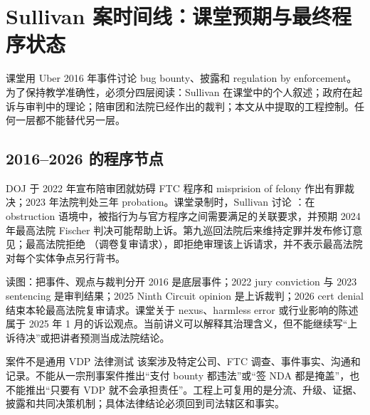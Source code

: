 \section{Sullivan 案时间线：课堂预期与最终程序状态}

课堂用 Uber 2016 年事件讨论 bug bounty、披露和 regulation by enforcement。为了保持教学准确性，必须分四层阅读：Sullivan 在课堂中的个人叙述；政府在起诉与审判中的理论；陪审团和法院已经作出的裁判；本文从中提取的工程控制。任何一层都不能替代另一层。

\subsection{2016--2026 的程序节点}

DOJ 于 2022 年宣布陪审团就妨碍 FTC 程序和 misprision of felony 作出有罪裁决；2023 年法院判处三年 probation。课堂录制时，Sullivan 讨论 ：在 obstruction 语境中，被指行为与官方程序之间需要满足的关联要求，并预期 2024 年最高法院 Fischer 判决可能帮助上诉。第九巡回法院后来维持定罪并发布修订意见；最高法院拒绝 （调卷复审请求），即拒绝审理该上诉请求，并不表示最高法院对每个实体争点另行背书。


\begin{knowledgebox}{读图：把事件、观点与裁判分开}
2016 是底层事件；2022 jury conviction 与 2023 sentencing 是审判结果；2025 Ninth Circuit opinion 是上诉裁判；2026 cert denial 结束本轮最高法院复审请求。课堂关于 nexus、harmless error 或行业影响的陈述属于 2025 年 1 月的诉讼观点。当前讲义可以解释其治理含义，但不能继续写“上诉待决”或把讲者预测当成法院结论。
\end{knowledgebox}

\begin{warningbox}{案件不是通用 VDP 法律测试}
该案涉及特定公司、FTC 调查、事件事实、沟通和记录。不能从一宗刑事案件推出“支付 bounty 都违法”或“签 NDA 都是掩盖”，也不能推出“只要有 VDP 就不会承担责任”。工程上可复用的是分流、升级、证据、披露和共同决策机制；具体法律结论必须回到司法辖区和事实。
\end{warningbox}


